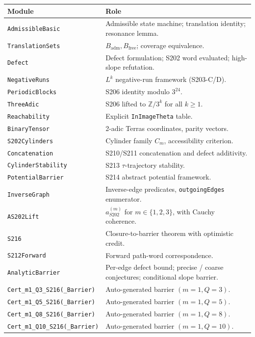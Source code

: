 \documentclass[11pt,a4paper]{article}
\theoremstyle{plain}
\theoremstyle{definition}
\newcommand{\ZZ}{\mathbb{Z}}
\newcommand{\aSat}{a_{S202}^{(m)}}
\begin{document}
\begin{center}\footnotesize
\begin{tabular}{lp{8.5cm}}
\toprule
Module & Role \\
\midrule
\texttt{AdmissibleBasic} & Admissible state machine; translation identity; resonance lemma. \\
\texttt{TranslationSets} & $B_{\mathrm{adm}}, B_{\mathrm{free}}$; coverage equivalence. \\
\texttt{Defect} & Defect formulation; S202 word evaluated; high-slope refutation. \\
\texttt{NegativeRuns} & $L^k$ negative-run framework (S203-C/D). \\
\texttt{PeriodicBlocks} & S206 identity modulo $3^{24}$. \\
\texttt{ThreeAdic} & S206 lifted to $\ZZ/3^k$ for all $k \ge 1$. \\
\texttt{Reachability} & Explicit \texttt{InImageTheta} table. \\
\texttt{BinaryTensor} & 2-adic Terras coordinates, parity vectors. \\
\texttt{S202Cylinders} & Cylinder family $C_m$, accessibility criterion. \\
\texttt{Concatenation} & S210/S211 concatenation and defect additivity. \\
\texttt{CylinderStability} & S213 $\tau$-trajectory stability. \\
\texttt{PotentialBarrier} & S214 abstract potential framework. \\
\texttt{InverseGraph} & Inverse-edge predicates, \texttt{outgoingEdges} enumerator. \\
\texttt{AS202Lift} & $\aSat$ for $m \in \{1, 2, 3\}$, with Cauchy coherence. \\
\texttt{S216} & Closure-to-barrier theorem with optimistic credit. \\
\texttt{S212Forward} & Forward path-word correspondence. \\
\texttt{AnalyticBarrier} & Per-edge defect bound; precise / coarse conjectures; conditional slope barrier. \\
\texttt{Cert\_m1\_Q3\_S216(\_Barrier)} & Auto-generated barrier $(m=1, Q=3)$. \\
\texttt{Cert\_m1\_Q5\_S216(\_Barrier)} & Auto-generated barrier $(m=1, Q=5)$. \\
\texttt{Cert\_m1\_Q8\_S216(\_Barrier)} & Auto-generated barrier $(m=1, Q=8)$. \\
\texttt{Cert\_m1\_Q10\_S216(\_Barrier)} & Auto-generated barrier $(m=1, Q=10)$. \\
\bottomrule
\end{tabular}
\end{center}
\end{document}
